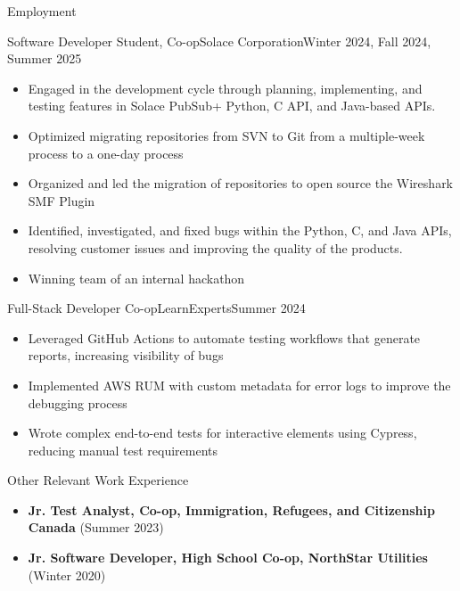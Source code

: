 \documentclass[]{mcdowellcv}
\begin{document}
	\begin{cvsection}{Employment}
		
	\begin{cvsubsection}{Software Developer Student, Co-op}{Solace Corporation}{Winter 2024, Fall 2024, Summer 2025}			
		\begin{itemize}
			\item Engaged in the development cycle through planning, implementing, and testing features in Solace PubSub+ Python, C API, and Java-based APIs.
			\item Optimized migrating repositories from SVN to Git from a multiple-week process to a one-day process
			\item Organized and led the migration of repositories to open source the Wireshark SMF Plugin
			\item Identified, investigated, and fixed bugs within the Python, C, and Java APIs, resolving customer issues and improving the quality of the products.
			\item Winning team of an internal hackathon	
		\end{itemize}
	\end{cvsubsection}

	\begin{cvsubsection}{Full-Stack Developer Co-op}{LearnExperts}{Summer 2024}			
		\begin{itemize}
			\item Leveraged GitHub Actions to automate testing workflows that generate reports, increasing visibility of bugs
			\item Implemented AWS RUM with custom metadata for error logs to improve the debugging process
			\item Wrote complex end-to-end tests for interactive elements using Cypress, reducing manual test requirements
		\end{itemize}
	\end{cvsubsection}

	\begin{cvsubsection}{Other Relevant Work Experience}{}{}
		\begin{itemize}
			\item \textbf{Jr. Test Analyst, Co-op, Immigration, Refugees, and Citizenship Canada} (Summer 2023)
			\item \textbf{Jr. Software Developer, High School Co-op, NorthStar Utilities} (Winter 2020)
		\end{itemize}
	\end{cvsubsection}
	\end{cvsection}
\end{document}
